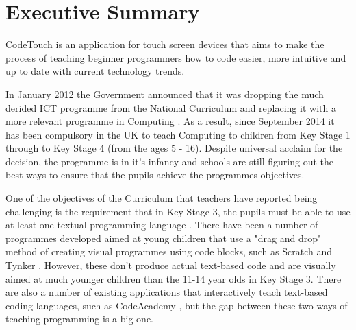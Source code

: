 \documentclass[ %
                    author={Jonathan Rankin},
                supervisor={Dr. David May, Dr. Ian Holyer},
                    degree={MEng},
                     title={CodeTouch},
                  subtitle={A Revolutionary Way To Program Real Code On Touch Screen Devices},
                      type={enterprise},
                      year={2015 } ]{dissertation}
\begin{document}
\frontmatter


\makedecl


\tableofcontents
\listoffigures
\listoftables
\listofalgorithms
\lstlistoflistings



\chapter*{Executive Summary}


\noindent
CodeTouch is an application for touch screen devices that aims to make the process of teaching beginner programmers 
how to code easier, more intuitive and up to date with current technology trends.

In January 2012 the Government
announced that it was dropping the much derided ICT programme from the National Curriculum and replacing it with 
a more relevant programme in Computing \cite{BBCITCstory}. As a result, since September 2014 it has been compulsory 
in the UK to teach Computing to children from Key Stage 1 through to Key Stage 4 (from the ages 5 - 16). Despite universal
acclaim for the decision, the programme is in it's infancy and schools are still figuring out the best ways to ensure that the pupils achieve the programmes objectives.

One of the objectives of the Curriculum that teachers have reported being challenging is the requirement that in Key Stage 3, the pupils must be able to use at least one textual programming language \cite{KS3}. There have been a number of programmes developed aimed at young children that use a "drag and drop" method of creating visual programmes using code blocks, such as Scratch \cite{Scratch} and Tynker \cite{Tynker}. However, these don't produce actual text-based code and are visually aimed at much younger children than the 11-14 year olds in Key Stage 3. There are also a number of existing applications that interactively teach text-based coding languages, such as CodeAcademy \cite{CodeAcademy}, but the gap between these two ways of teaching programming is a big one. 
\end{document}
